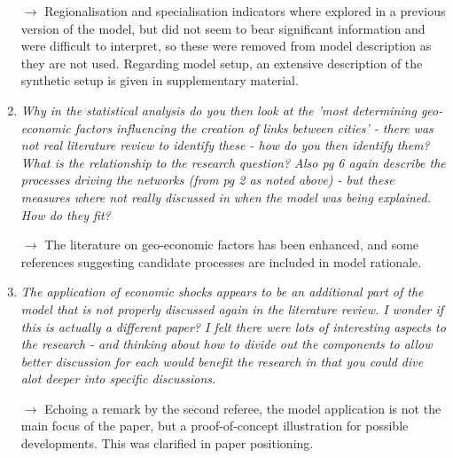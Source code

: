 \documentclass[10pt,a4paper,sans]{moderncv}
\begin{document}
\begin{enumerate}
	$\rightarrow$ Regionalisation and specialisation indicators where explored in a previous version of the model, but did not seem to bear significant information and were difficult to interpret, so these were removed from model description as they are not used. Regarding model setup, an extensive description of the synthetic setup is given in supplementary material.
	
	\medskip

	\item \textit{Why in the statistical analysis do you then look at the 'most determining geo-economic factors influencing the creation of links between cities' - there was not real literature review to identify these - how do you then identify them? What is the relationship to the research question? Also pg 6 again describe the processes driving the networks (from pg 2 as noted above) - but these measures where not really discussed in when the model was being explained. How do they fit?}
	 
	$\rightarrow$ The literature on geo-economic factors has been enhanced, and some references suggesting candidate processes are included in model rationale.
	
	\medskip

	\item \textit{The application of economic shocks appears to be an additional part of the model that is not properly discussed again in the literature review. I wonder if this is actually a different paper? I felt there were lots of interesting aspects to the research - and thinking about how to divide out the components to allow better discussion for each would benefit the research in that you could dive alot deeper into specific discussions.}
	
	$\rightarrow$ Echoing a remark by the second referee, the model application is not the main focus of the paper, but a proof-of-concept illustration for possible developments. This was clarified in paper positioning.
	
	\medskip


\end{enumerate}
\end{document}

